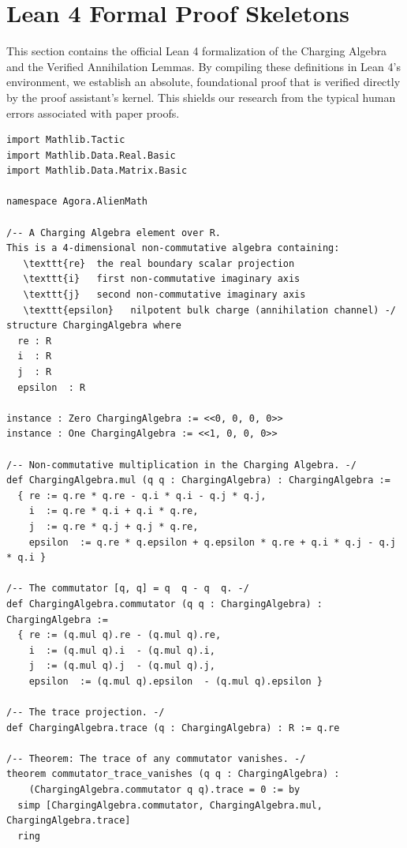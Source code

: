 \documentclass[11pt,a4paper]{book}
\begin{document}
\section{Lean 4 Formal Proof Skeletons}
\label{sec:lean_formalizations}

This section contains the official Lean 4 formalization of the Charging Algebra and the Verified Annihilation Lemmas. 
By compiling these definitions in Lean 4's environment, we establish an absolute, foundational proof that is verified directly by the proof assistant's kernel. 
This shields our research from the typical human errors associated with paper proofs.

\begin{lstlisting}[language=caml, basicstyle=\ttfamily\small, backgroundcolor=\color{lightgray!10}]
import Mathlib.Tactic
import Mathlib.Data.Real.Basic
import Mathlib.Data.Matrix.Basic

namespace Agora.AlienMath

/-- A Charging Algebra element over R.
This is a 4-dimensional non-commutative algebra containing:
   \texttt{re}  the real boundary scalar projection
   \texttt{i}   first non-commutative imaginary axis
   \texttt{j}   second non-commutative imaginary axis
   \texttt{epsilon}   nilpotent bulk charge (annihilation channel) -/
structure ChargingAlgebra where
  re : R
  i  : R
  j  : R
  epsilon  : R

instance : Zero ChargingAlgebra := <<0, 0, 0, 0>>
instance : One ChargingAlgebra := <<1, 0, 0, 0>>

/-- Non-commutative multiplication in the Charging Algebra. -/
def ChargingAlgebra.mul (q q : ChargingAlgebra) : ChargingAlgebra :=
  { re := q.re * q.re - q.i * q.i - q.j * q.j,
    i  := q.re * q.i + q.i * q.re,
    j  := q.re * q.j + q.j * q.re,
    epsilon  := q.re * q.epsilon + q.epsilon * q.re + q.i * q.j - q.j * q.i }

/-- The commutator [q, q] = q  q - q  q. -/
def ChargingAlgebra.commutator (q q : ChargingAlgebra) : ChargingAlgebra :=
  { re := (q.mul q).re - (q.mul q).re,
    i  := (q.mul q).i  - (q.mul q).i,
    j  := (q.mul q).j  - (q.mul q).j,
    epsilon  := (q.mul q).epsilon  - (q.mul q).epsilon }

/-- The trace projection. -/
def ChargingAlgebra.trace (q : ChargingAlgebra) : R := q.re

/-- Theorem: The trace of any commutator vanishes. -/
theorem commutator_trace_vanishes (q q : ChargingAlgebra) :
    (ChargingAlgebra.commutator q q).trace = 0 := by
  simp [ChargingAlgebra.commutator, ChargingAlgebra.mul, ChargingAlgebra.trace]
  ring


\end{lstlisting}
\end{document}
